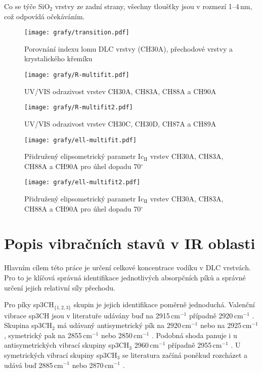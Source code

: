 Co se týče SiO$_2$ vrstvy ze zadní strany, všechny tloušťky jsou v rozmezí 1--4\,nm, což odpovídá očekáváním.

\begin{figure}[tbhp]
	\texttt{[image: grafy/transition.pdf]}
	\caption{Porovnání indexu lomu DLC vrstvy (CH30A), přechodové vrstvy a krystalického křemíku} 
	\label{transition}
\end{figure}

\begin{figure}[ht]
	\texttt{[image: grafy/R-multifit.pdf]}
	\caption{UV/VIS odrazivost vrstev CH30A, CH83A, CH88A a CH90A}
	\label{R-multifit}
\end{figure}

\begin{figure}[ht]
	\texttt{[image: grafy/R-multifit2.pdf]}
	\caption{UV/VIS odrazivost vrstev CH30C, CH30D, CH87A a CH89A}
	\label{R-multifit2}
\end{figure}

\begin{figure}[ht]
	\texttt{[image: grafy/ell-multifit.pdf]}
	\caption{Přidružený elipsometrický parametr Ic$_{\mathrm{II}}$ vrstev CH30A, CH83A, CH88A a CH90A pro úhel dopadu 70$^\circ$}
	\label{ell-multifit}
\end{figure}

\begin{figure}[ht]
	\texttt{[image: grafy/ell-multifit2.pdf]}
	\caption{Přidružený elipsometrický parametr Ic$_{\mathrm{II}}$ vrstev CH30A, CH83A, CH88A a CH90A pro úhel dopadu 70$^\circ$}
	\label{ell-multifit}
\end{figure}

\section{Popis vibračních stavů v IR oblasti}
Hlavním cílem této práce je určení celkové koncentrace vodíku v DLC vrstvách. Pro to je klíčová správná identifikace jednotlivých absorpčních píků a správné určení jejich relativní síly přechodu.

Pro píky sp3CH$_{\{1,2,3\}}$ skupin je jejich identifikace poměrně jednoduchá. Valenční vibrace sp3CH jsou v literatuře udávány buď na 2915\,cm$^{-1}$ \cite{Zajickova2011, Dischler1983} případně 2920\,cm$^{-1}$ \cite{Robertson2002, Ristein1998}. Skupina sp3CH$_2$ má udávaný antisymetrický pík na 2920\,cm$^{-1}$ \cite{Dischler1983, Robertson2002, Ristein1998} nebo na 2925\,cm$^{-1}$ \cite{Zajickova2011}, symetrický pak na 2855\,cm$^{-1}$ \cite{Robertson2002, Ristein1998, Zajickova2011} nebo 2850\,cm$^{-1}$ \cite{Dischler1983}. Podobná shoda panuje i u antisymetrických vibrací skupiny sp3CH$_3$ 2960\,cm$^{-1}$ \cite{Zajickova2011, Dischler1983} případně 2955\,cm$^{-1}$ \cite{Robertson2002, Ristein1998}. U symetrických vibrací skupiny sp3CH$_3$ se literatura začíná poněkud rozcházet a udává buď 2885\,cm$^{-1}$ \cite{Robertson2002, Ristein1998} nebo 2870\,cm$^{-1}$ \cite{Zajickova2011, Dischler1983}. 

